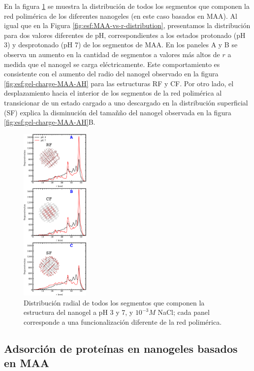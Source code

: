 En la figura \ref{fig:esf:allr-distribution} se muestra la distribuci\'on de todos los segmentos que componen la red polim\'erica de los diferentes nanogeles (en este caso basados en MAA). Al igual que en la Figura \ref{fig:esf:MAA-vs-r-distribution}, presentamos la distribuci\'on para dos valores diferentes de pH, correspondientes a los estados protonado (pH 3) y desprotonado (pH 7) de los segmentos de MAA. En los paneles A y B se observa un aumento en la cantidad de segmentos a valores m\'as altos de $r$ a medida que el nanogel se carga el\'ectricamente. Este comportamiento es consistente con el aumento del radio del nanogel observado en la figura \ref{fig:esf:gel-charge-MAA-AH} para las estructuras RF y CF. Por otro lado, el desplazamiento hacia el interior de los segmentos de la red polim\'erica al transicionar de un estado cargado a uno descargado en la distribuci\'on superficial (SF) explica la disminuci\'on del tamañ\~no del nanogel observada en la figura \ref{fig:esf:gel-charge-MAA-AH}B.

\begin{figure}[!htb]
	\centering
	\includegraphics[width=0.30\textwidth]{Figures/graphs-gel2/allseg_SI.pdf}
	\caption{Distribuci\'on radial de todos los segmentos que componen la estructura del nanogel a pH 3 y 7, y $10^{-3}M$ NaCl; cada panel corresponde a una funcionalizaci\'on  diferente de la red polim\'erica.}
	\label{fig:esf:allr-distribution}
\end{figure}




\subsection{Adsorci\'on de prote\'inas en nanogeles basados en MAA}\label{sec:MAA-NGs}



